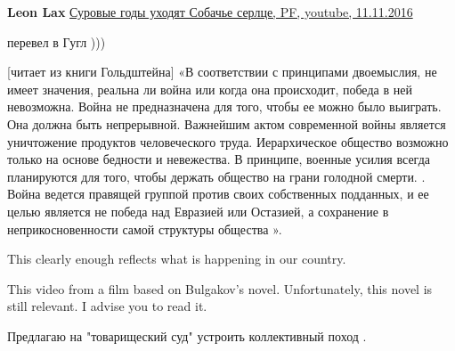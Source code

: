 \begin{itemize}
\begin{itemize}
 
\textbf{Leon Lax}
\href{https://youtu.be/OK9n46ZY8JE}{%
Суровые годы уходят Собачье серлце, PF, youtube, 11.11.2016%
}

 

перевел в Гугл )))

[читает из книги Гольдштейна] «В соответствии с принципами двоемыслия, не имеет
значения, реальна ли война или когда она происходит, победа в ней невозможна.
Война не предназначена для того, чтобы ее можно было выиграть. Она должна быть
непрерывной. Важнейшим актом современной войны является уничтожение продуктов
человеческого труда. Иерархическое общество возможно только на основе бедности
и невежества. В принципе, военные усилия всегда планируются для того, чтобы
держать общество на грани голодной смерти. . Война ведется правящей группой
против своих собственных подданных, и ее целью является не победа над Евразией
или Остазией, а сохранение в неприкосновенности самой структуры общества ».


 

This clearly enough reflects what is happening in our country.

This video from a film based on Bulgakov's novel. Unfortunately, this novel is
still relevant. I advise you to read it.

\end{itemize}

 
Предлагаю на "товарищеский суд" устроить коллективный поход .


\end{itemize}
